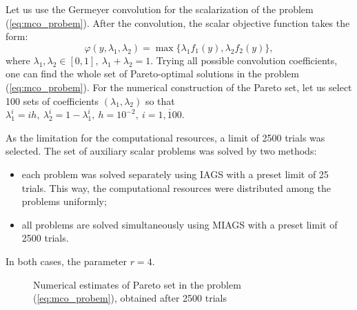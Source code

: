 \documentclass[runningheads]{llncs}
\begin{document}
Let us use the Germeyer convolution for the scalarization of the problem
(\ref{eq:mco_probem}).
After the convolution, the scalar objective function takes the form:
\begin{equation}
  \varphi(y,\lambda_1,\lambda_2)=\max\{\lambda_1 f_1(y), \lambda_2 f_2(y)\},
\end{equation}
where \(\lambda_1,\lambda_2\in[0,1],\: \lambda_1+\lambda_2=1\).
Trying all possible convolution coefficients, one can find the whole set of Pareto-optimal
solutions in the problem (\ref{eq:mco_probem}).
For the numerical construction of the Pareto set, let us select 100 sets of coefficients
\((\lambda_1,\lambda_2)\) so that
\(\lambda_1^i=i h,\: \lambda_2^i=1-\lambda_1^i,\: h=10^{-2},\: i=\overline{1, 100}\).

As the limitation for the computational resources, a limit of 2500 trials was selected.
The set of auxiliary scalar problems was solved by two methods:
\begin{itemize}
  \item each problem was solved separately using IAGS with a preset limit of 25 trials. This way,
the computational resources were distributed among the problems uniformly;
  \item all problems are solved simultaneously using MIAGS with a preset limit of
2500 trials.
\end{itemize}
In both cases, the parameter \(r=4\).

\begin{figure}[ht]
    \centering
    \caption{Numerical estimates of Pareto set in the problem (\ref{eq:mco_probem}), obtained
after 2500 trials}
    \label{fig:mco_pareto}
\end{figure}
\end{document}
